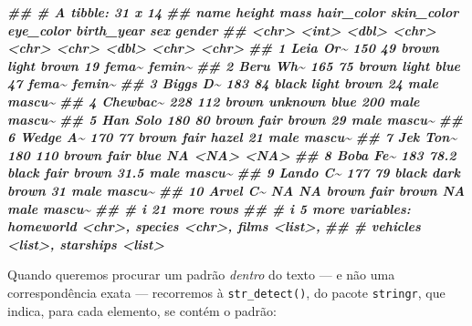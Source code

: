 \documentclass[
  portuguese,
  11pt,
  openany]{book}
\newenvironment{Shaded}{\begin{snugshade}}{\end{snugshade}}
\newcommand{\DocumentationTok}[1]{\textcolor[rgb]{0.56,0.35,0.01}{\textbf{\textit{#1}}}}
\begin{document}
\begin{Shaded}
\begin{Highlighting}[]
\DocumentationTok{\#\# \# A tibble: 31 x 14}
\DocumentationTok{\#\#    name     height  mass hair\_color skin\_color eye\_color birth\_year sex   gender}
\DocumentationTok{\#\#    \textless{}chr\textgreater{}     \textless{}int\textgreater{} \textless{}dbl\textgreater{} \textless{}chr\textgreater{}      \textless{}chr\textgreater{}      \textless{}chr\textgreater{}          \textless{}dbl\textgreater{} \textless{}chr\textgreater{} \textless{}chr\textgreater{} }
\DocumentationTok{\#\#  1 Leia Or\textasciitilde{}    150  49   brown      light      brown           19   fema\textasciitilde{} femin\textasciitilde{}}
\DocumentationTok{\#\#  2 Beru Wh\textasciitilde{}    165  75   brown      light      blue            47   fema\textasciitilde{} femin\textasciitilde{}}
\DocumentationTok{\#\#  3 Biggs D\textasciitilde{}    183  84   black      light      brown           24   male  mascu\textasciitilde{}}
\DocumentationTok{\#\#  4 Chewbac\textasciitilde{}    228 112   brown      unknown    blue           200   male  mascu\textasciitilde{}}
\DocumentationTok{\#\#  5 Han Solo    180  80   brown      fair       brown           29   male  mascu\textasciitilde{}}
\DocumentationTok{\#\#  6 Wedge A\textasciitilde{}    170  77   brown      fair       hazel           21   male  mascu\textasciitilde{}}
\DocumentationTok{\#\#  7 Jek Ton\textasciitilde{}    180 110   brown      fair       blue            NA   \textless{}NA\textgreater{}  \textless{}NA\textgreater{}  }
\DocumentationTok{\#\#  8 Boba Fe\textasciitilde{}    183  78.2 black      fair       brown           31.5 male  mascu\textasciitilde{}}
\DocumentationTok{\#\#  9 Lando C\textasciitilde{}    177  79   black      dark       brown           31   male  mascu\textasciitilde{}}
\DocumentationTok{\#\# 10 Arvel C\textasciitilde{}     NA  NA   brown      fair       brown           NA   male  mascu\textasciitilde{}}
\DocumentationTok{\#\# \# i 21 more rows}
\DocumentationTok{\#\# \# i 5 more variables: homeworld \textless{}chr\textgreater{}, species \textless{}chr\textgreater{}, films \textless{}list\textgreater{},}
\DocumentationTok{\#\# \#   vehicles \textless{}list\textgreater{}, starships \textless{}list\textgreater{}}
\end{Highlighting}
\end{Shaded}

Quando queremos procurar um padrão \emph{dentro} do texto --- e não uma correspondência
exata --- recorremos à \texttt{str\_detect()}, do pacote \texttt{stringr}, que indica, para cada
elemento, se contém o padrão:
\end{document}
